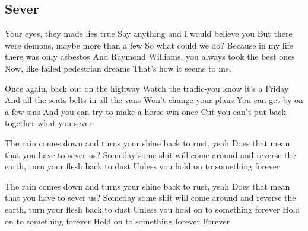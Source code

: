 \subsection*{Sever   }
\begin{guitar}
Your eyes, they made lies true
Say anything and I would believe you
But there were demons, maybe more than a few
So what could we do?
Because in my life there was only asbestos
And Raymond Williams, you always took the best ones
Now, like failed pedestrian dreams
That's how it seems to me.



Once again, back out on the highway
Watch the traffic-you know it's a Friday
And all the seats-belts in all the vans
Won't change your plans
You can get by on a few sins
And you can try to make a horse win once
Cut you can't put back together what you sever



The rain comes down and turns your shine back to rust, yeah
Does that mean that you have to sever us?
Someday some shit will come around and reverse the earth, turn your flesh back to dust
Unless you hold on to something forever



The rain comes down and turns your shine back to rust, yeah
Does that mean that you have to sever us?
Someday some shit will come around and reverse the earth, turn your flesh back to dust
Unless you hold on to something forever
Hold on to something forever
Hold on to something forever
Forever 
\end{guitar}
